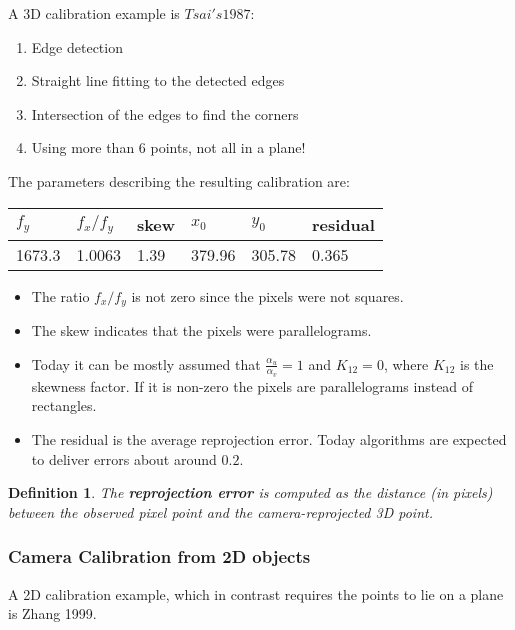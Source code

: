 \documentclass[10pt,a4paper]{scrartcl}
\newtheorem{define}{Definition}
\begin{document}
\begin{multicols*}{2}
A 3D calibration example is $Tsai's 1987$:

\begin{enumerate}
\item Edge detection
\item Straight line fitting to the detected edges
\item Intersection of the edges to find the corners
\item Using more than 6 points, not all in a plane!
\end{enumerate}

The parameters describing the resulting calibration are:

\begin{center}
\begin{tabular}{|l|l|l|l|l|l|}
$f_y$&$f_x/f_y$&skew&$x_0$&$y_0$&residual\\
\hline\hline
1673.3&1.0063&1.39&379.96&305.78&0.365
\end{tabular}
\end{center}

\begin{itemize}
\item The ratio $f_x/f_y$ is not zero since the pixels were not squares.
\item The skew indicates that the pixels were parallelograms.
\item Today it can be mostly assumed that $\frac{\alpha_u}{\alpha_v}=1$ and $K_{12}=0$, where $K_{12}$ is the skewness factor. If it is non-zero the pixels are parallelograms instead of rectangles. 
\item The residual is the average reprojection error. Today algorithms are expected to deliver errors about around $0.2$.
\end{itemize}

\begin{define}
The \textbf{reprojection error} is computed as the distance (in pixels) between the observed pixel point and the camera-reprojected 3D point.
\end{define}

\subsubsection{Camera Calibration from 2D objects}

A 2D calibration example, which in contrast requires the points to lie on a plane is Zhang 1999.


\end{multicols*}
\end{document}
